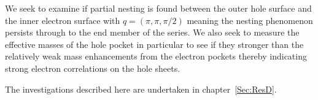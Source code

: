 We seek to examine if partial nesting is found between the outer hole surface and the inner electron surface with $q=(\pi, \pi, \pi/2)$ meaning the nesting phenomenon persists through to the end member of the series. We also seek to measure the effective masses of the hole pocket in particular to see if they stronger than the relatively weak mass enhancements from the electron pockets thereby indicating strong electron correlations on the hole sheets.

The investigations described here are undertaken in chapter~\ref{Sec:ResD}.





